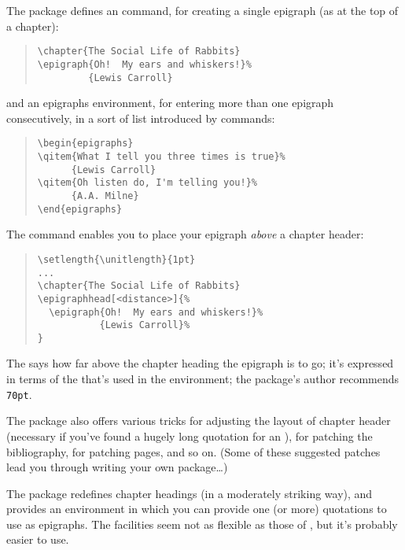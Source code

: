 The  package defines an  command, for
creating a single 
epigraph (as at the top of a chapter):
\begin{quote}
\begin{verbatim}
\chapter{The Social Life of Rabbits}
\epigraph{Oh!  My ears and whiskers!}%
         {Lewis Carroll}
\end{verbatim}
\end{quote}
and an epigraphs environment, for entering more than one epigraph
consecutively, in a sort of list introduced by  commands:
\begin{quote}
\begin{verbatim}
\begin{epigraphs}
\qitem{What I tell you three times is true}%
      {Lewis Carroll}
\qitem{Oh listen do, I'm telling you!}%
      {A.A. Milne}
\end{epigraphs}
\end{verbatim}
\end{quote}
The  command enables you to place your epigraph
\emph{above} a chapter header:
\begin{quote}
\begin{verbatim}
\setlength{\unitlength}{1pt}
...
\chapter{The Social Life of Rabbits}
\epigraphhead[<distance>]{%
  \epigraph{Oh!  My ears and whiskers!}%
           {Lewis Carroll}%
}
\end{verbatim}
\end{quote}
The  says how far above the chapter heading the
epigraph is to go; it's expressed in terms of the 
that's used in the  environment; the package's
author recommends \texttt{70pt}.

The package also offers various tricks for adjusting the layout of
chapter header (necessary if you've found a hugely long quotation for
an ), for patching the bibliography, for patching
 pages, and so on.  (Some of these suggested patches lead you
through writing your own package\dots{})

The  package redefines chapter headings (in a
moderately striking way), and provides an environment
 in which you can provide one (or more)
quotations to use as epigraphs.  The facilities seem not as flexible
as those of , but it's probably easier to use.

